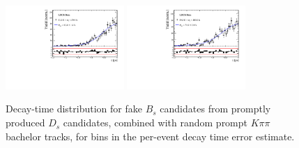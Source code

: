\begin{figure}[h]
\includegraphics[height=!,width=0.4\textwidth]{figs/Resolution/SignalData_bin_7.pdf}
\includegraphics[height=!,width=0.4\textwidth]{figs/Resolution/SignalData_bin_8.pdf}
\caption{Decay-time distribution for fake $B_s$ candidates from promptly produced $D_s$ candidates, combined with random prompt $K\pi\pi$ bachelor tracks, for bins in the per-event decay time error estimate.}
\label{fig:}
\end{figure}




